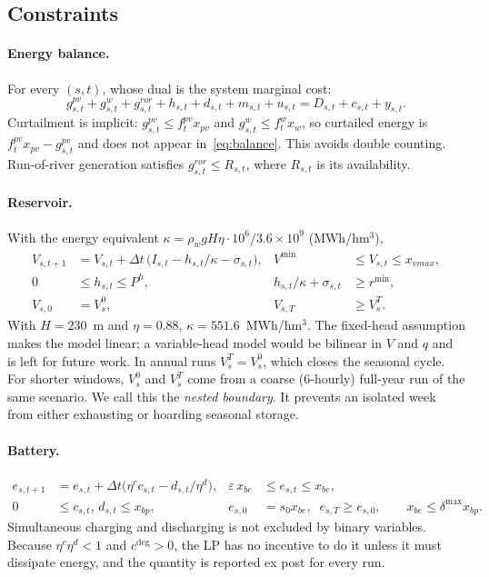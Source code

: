 \subsection{Constraints}
\paragraph{Energy balance.} For every $(s,t)$, whose dual is the system marginal cost:
\begin{equation}
g^{pv}_{s,t}+g^{w}_{s,t}+g^{ror}_{s,t}+h_{s,t}+d_{s,t}+m_{s,t}+u_{s,t}=D_{s,t}+c_{s,t}+y_{s,t}.
\label{eq:balance}
\end{equation}
Curtailment is implicit: $g^{pv}_{s,t}\le f^{pv}_t x_{pv}$ and $g^{w}_{s,t}\le f^{w}_t x_{w}$, so curtailed energy is
$f^{pv}_t x_{pv}-g^{pv}_{s,t}$ and does not appear in~\eqref{eq:balance}. This avoids double counting.
Run-of-river generation satisfies $g^{ror}_{s,t}\le R_{s,t}$, where $R_{s,t}$ is its availability.

\paragraph{Reservoir.} With the energy equivalent $\kappa=\rho_w g H\eta\cdot10^6/3.6\times10^9$ (MWh/hm$^3$),
\begin{align}
V_{s,t+1}&=V_{s,t}+\Delta t\,\big(I_{s,t}-h_{s,t}/\kappa-\sigma_{s,t}\big), &
V^{\min}&\le V_{s,t}\le x_{vmax}, \label{eq:water}\\
0&\le h_{s,t}\le P^h, & h_{s,t}/\kappa+\sigma_{s,t}&\ge r^{\min}, \label{eq:hydro}\\
V_{s,0}&=V^0_s, & V_{s,T}&\ge V^T_s. \label{eq:terminal}
\end{align}
With $H=230$~m and $\eta=0.88$, $\kappa=551.6$~MWh/hm$^3$. The fixed-head assumption makes the model linear; a
variable-head model would be bilinear in $V$ and $q$ and is left for future work. In annual runs
$V^T_s=V^0_s$, which closes the seasonal cycle. For shorter windows, $V^0_s$ and $V^T_s$ come from a coarse
(6-hourly) full-year run of the same scenario. We call this the \emph{nested boundary}. It prevents an isolated
week from either exhausting or hoarding seasonal storage.

\paragraph{Battery.}
\begin{align}
e_{s,t+1}&=e_{s,t}+\Delta t\big(\eta^c c_{s,t}-d_{s,t}/\eta^d\big), &
\varepsilon\,x_{be}&\le e_{s,t}\le x_{be}, \label{eq:soc}\\
0&\le c_{s,t},\,d_{s,t}\le x_{bp}, & e_{s,0}&=s_0x_{be},\;\; e_{s,T}\ge e_{s,0},\qquad x_{be}\le\delta^{\max}x_{bp}. \label{eq:batt}
\end{align}
Simultaneous charging and discharging is not excluded by binary variables. Because $\eta^c\eta^d<1$ and
$c^{\deg}>0$, the LP has no incentive to do it unless it must dissipate energy, and the quantity is reported
ex post for every run.

